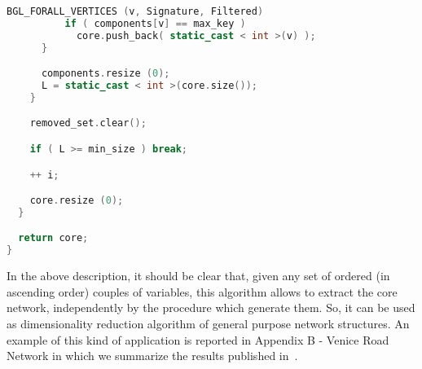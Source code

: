 \documentclass{standalone}
\begin{document}
\begin{lstlisting}[language=C++, caption=DNetPRO signature extraction, label=code:featuresel]
        BGL_FORALL_VERTICES (v, Signature, Filtered)
          if ( components[v] == max_key )
            core.push_back( static_cast < int >(v) );
      }

      components.resize (0);
      L = static_cast < int >(core.size());
    }

    removed_set.clear();

    if ( L >= min_size ) break;

    ++ i;

    core.resize (0);
  }

  return core;
}

\end{lstlisting}

In the above description, it should be clear that, given any set of ordered (in ascending order) couples of variables, this algorithm allows to extract the core network, independently by the procedure which generate them.
So, it can be used as dimensionality reduction algorithm of general purpose network structures.
An example of this kind of application is reported in Appendix B - Venice Road Network in which we summarize the results published in~\cite{Mizzi2018, CurtiSDPS2018}.
\end{document}
